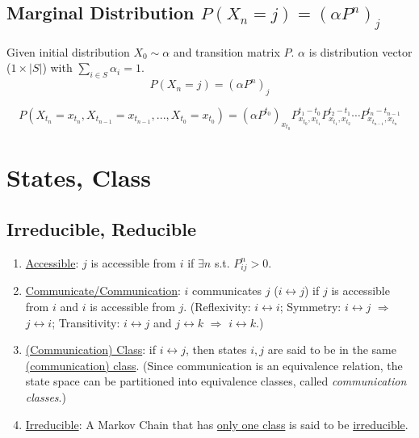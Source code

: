 \documentclass[11pt]{elegantbook}
\begin{document}
\subsection{Marginal Distribution $P(X_n=j)=(\alpha P^n)_{j}$}
\begin{lemma}
    Given initial distribution $X_0\sim\alpha$ and transition matrix $P$. $\alpha$ is distribution vector ($1\times|S|$) with $\sum_{i\in S}{\alpha_i}=1$.
    $$P(X_n=j)=(\alpha P^n)_{j}$$
\end{lemma}
\begin{corollary}
    $$P(X_{t_{n}}=x_{t_{n}},X_{t_{n-1}}=x_{t_{n-1}},...,X_{t_0}=x_{t_0})=(\alpha P^{t_0})_{x_{t_0}}P^{t_1-t_0}_{x_{t_0},x_{t_1}}P^{t_2-t_1}_{x_{t_1},x_{t_2}}\cdots P^{t_{n}-t_{n-1}}_{x_{t_{n-1}},x_{t_{n}}}$$
\end{corollary}

\section{States, Class}
\subsection{Irreducible, Reducible}
\begin{enumerate}[$\bullet$]
    \item \underline{Accessible}: $j$ is accessible from $i$ if $\exists n$ s.t. $P_{ij}^n>0$.
    \item \underline{Communicate/Communication}: $i$ communicates $j$ ($i \leftrightarrow j$) if $j$ is accessible from $i$ and $i$ is accessible from $j$. (Reflexivity: $i \leftrightarrow i$; Symmetry: $i \leftrightarrow j$ $\Rightarrow$ $j \leftrightarrow i$; Transitivity: $i \leftrightarrow j$ and $j \leftrightarrow k$ $\Rightarrow$ $i \leftrightarrow k$.)
    \item \underline{(Communication) Class}: if $i \leftrightarrow j$, then states $i,j$ are said to be in the same \underline{(communication) class}. (Since communication is an equivalence relation, the state space can be partitioned into equivalence classes, called \textit{communication classes}.)
    \item \underline{Irreducible}: A Markov Chain that has \underline{only one class} is said to be \underline{irreducible}.
\end{enumerate}
\end{document}
